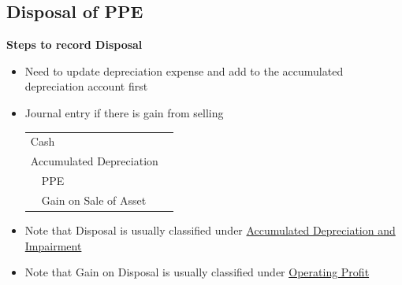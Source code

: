 \documentclass{article}
\begin{document}
\begin{multicols}{2}
\subsection{Disposal of PPE}
\textbf{Steps to record Disposal}
\begin{itemize}
	\item Need to update depreciation expense and add to the accumulated depreciation account first
	\item Journal entry if there is gain from selling\vspace{0.5em}\\
	\begin{tabular}{llll}
		\multicolumn{4}{l}{Cash}\\
		\multicolumn{4}{l}{Accumulated Depreciation}\\
		& PPE& &\\
		& Gain on Sale of Asset
	\end{tabular}
    \item Note that Disposal is usually classified under \underline{Accumulated Depreciation and Impairment}
    \item Note that Gain on Disposal is usually classified under \underline{Operating Profit}
\end{itemize}

\end{multicols}
\end{document}

